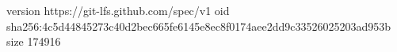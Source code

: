 version https://git-lfs.github.com/spec/v1
oid sha256:4c5d44845273c40d2bec665fe6145e8ec8f0174aee2dd9c33526025203ad953b
size 174916
